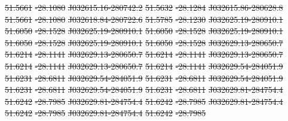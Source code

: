 \documentclass[11pt, a4paper]{book}
\providecommand{\DIFdeltex}[1]{{\protect\color{red}\sout{#1}}}                      %
\providecommand{\DIFdel}[1]{\texorpdfstring{\DIFdeltex{#1}}{}} %
\begin{document}
\DIFdel{51.5661 }%
\DIFdel{-28.1080 }%
\DIFdel{J032615.16-280742.2 }%
\DIFdel{51.5632 }%
\DIFdel{-28.1284 }%
\DIFdel{J032615.86-280628.8 }%
\DIFdel{51.5661 }%
\DIFdel{-28.1080 }%
\DIFdel{J032618.84-280722.6 }%
\DIFdel{51.5785 }%
\DIFdel{-28.1230}%
\DIFdel{J032625.19-280910.1 }%
\DIFdel{51.6050 }%
\DIFdel{-28.1528 }%
\DIFdel{J032625.19-280910.1 }%
\DIFdel{51.6050 }%
\DIFdel{-28.1528 }%
\DIFdel{J032625.19-280910.1 }%
\DIFdel{51.6050 }%
\DIFdel{-28.1528 }%
\DIFdel{J032625.19-280910.1 }%
\DIFdel{51.6050 }%
\DIFdel{-28.1528}%
\DIFdel{J032629.13-280650.7 }%
\DIFdel{51.6214 }%
\DIFdel{-28.1141 }%
\DIFdel{J032629.13-280650.7 }%
\DIFdel{51.6214 }%
\DIFdel{-28.1141 }%
\DIFdel{J032629.13-280650.7 }%
\DIFdel{51.6214 }%
\DIFdel{-28.1141 }%
\DIFdel{J032629.13-280650.7 }%
\DIFdel{51.6214 }%
\DIFdel{-28.1141}%
\DIFdel{J032629.54-284051.9 }%
\DIFdel{51.6231 }%
\DIFdel{-28.6811 }%
\DIFdel{J032629.54-284051.9 }%
\DIFdel{51.6231 }%
\DIFdel{-28.6811 }%
\DIFdel{J032629.54-284051.9 }%
\DIFdel{51.6231 }%
\DIFdel{-28.6811 }%
\DIFdel{J032629.54-284051.9 }%
\DIFdel{51.6231 }%
\DIFdel{-28.6811}%
\DIFdel{J032629.81-284754.4 }%
\DIFdel{51.6242 }%
\DIFdel{-28.7985 }%
\DIFdel{J032629.81-284754.4 }%
\DIFdel{51.6242 }%
\DIFdel{-28.7985 }%
\DIFdel{J032629.81-284754.4 }%
\DIFdel{51.6242 }%
\DIFdel{-28.7985 }%
\DIFdel{J032629.81-284754.4 }%
\DIFdel{51.6242 }%
\DIFdel{-28.7985}%
\end{document}
